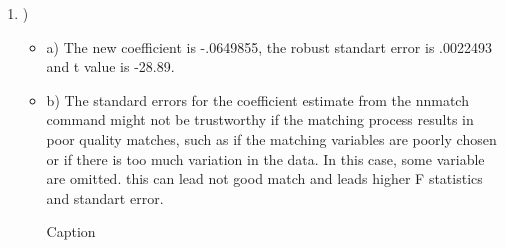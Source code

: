 \documentclass{article}
\begin{document}
\begin{enumerate}
\begin{itemize}
\end {itemize}


\item )

\begin{itemize}

\item a) The new coefficient is -.0649855, the robust standart error is .0022493 and t value is -28.89.
 
\vspace{0.5cm}

\item b) The standard errors for the coefficient estimate from the nnmatch command might not be trustworthy if the matching process results in poor quality matches, such as if the matching variables are poorly chosen or if there is too much variation in the data. In this case, some variable are omitted. this can lead not good match and leads higher F statistics and standart error.

\begin{table}[]
    \centering
    
    \caption{Caption}
    \label{tab:HW8}
\end{table}


\end {itemize}
\end {enumerate}
\end{document}
